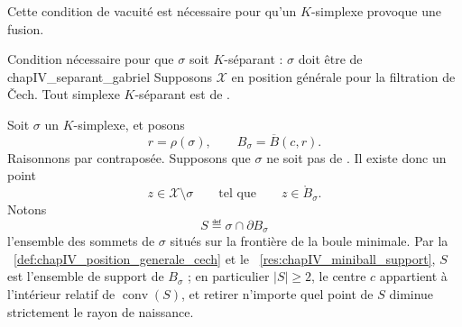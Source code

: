 Cette condition de vacuité est nécessaire pour qu'un $K$-simplexe provoque une fusion.

\begin{Theoreme}{Condition nécessaire pour que $\sigma$ soit $K$-séparant : $\sigma$ doit être de }{chapIV_separant_gabriel}
Supposons $\mathcal X$ en position générale pour la filtration de \v Cech. Tout simplexe $K$-séparant est de .
\end{Theoreme}

\begin{Preuve}
Soit $\sigma$ un $K$-simplexe, et posons
\[
    r=\rho(\sigma),
    \qquad
    B_\sigma=\overline B(c,r).
\]
Raisonnons par contraposée. Supposons que $\sigma$ ne soit pas de . Il existe donc un point
\[
    z\in \mathcal X\setminus\sigma
    \qquad\text{tel que}\qquad
    z\in\mathring{B}_\sigma.
\]
Notons
\[
    S\eqdef \sigma\cap\partial B_\sigma
\]
l'ensemble des sommets de $\sigma$ situés sur la frontière de la boule minimale. Par la \Def~\ref{def:chapIV_position_generale_cech} et le \Res~\ref{res:chapIV_miniball_support}, $S$ est l'ensemble de support de $B_\sigma$ ; en particulier $|S|\ge2$, le centre $c$ appartient à l'intérieur relatif de $\operatorname{conv}(S)$, et retirer n'importe quel point de $S$ diminue strictement le rayon de naissance.





\end{Preuve}
